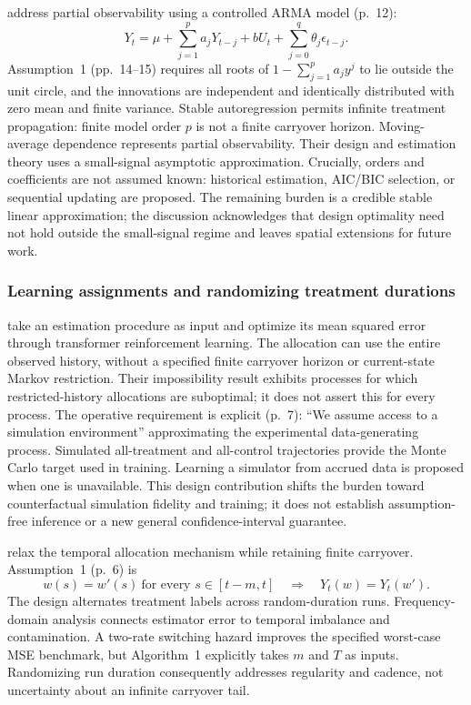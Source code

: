 \documentclass[12pt]{article}
\begin{document}
\citet{sun2024} address partial observability using a controlled ARMA model (p.~12):
\begin{equation}
 Y_t=\mu+\sum_{j=1}^{p}a_jY_{t-j}+bU_t
       +\sum_{j=0}^{q}\theta_j\epsilon_{t-j}.
\end{equation}
Assumption~1 (pp.~14--15) requires all roots of $1-\sum_{j=1}^{p}a_j y^j$ to lie outside the unit circle, and the innovations are independent and identically distributed with zero mean and finite variance. Stable autoregression permits infinite treatment propagation: finite model order $p$ is not a finite carryover horizon. Moving-average dependence represents partial observability. Their design and estimation theory uses a small-signal asymptotic approximation. Crucially, orders and coefficients are not assumed known: historical estimation, AIC/BIC selection, or sequential updating are proposed. The remaining burden is a credible stable linear approximation; the discussion acknowledges that design optimality need not hold outside the small-signal regime and leaves spatial extensions for future work.

\subsubsection{Learning assignments and randomizing treatment durations}

\citet{wu2026} take an estimation procedure as input and optimize its mean squared error through transformer reinforcement learning. The allocation can use the entire observed history, without a specified finite carryover horizon or current-state Markov restriction. Their impossibility result exhibits processes for which restricted-history allocations are suboptimal; it does not assert this for every process. The operative requirement is explicit (p.~7): ``We assume access to a simulation environment'' approximating the experimental data-generating process. Simulated all-treatment and all-control trajectories provide the Monte Carlo target used in training. Learning a simulator from accrued data is proposed when one is unavailable. This design contribution shifts the burden toward counterfactual simulation fidelity and training; it does not establish assumption-free inference or a new general confidence-interval guarantee.

\citet{hu2026} relax the temporal allocation mechanism while retaining finite carryover. Assumption~1 (p.~6) is
\begin{equation}
 w(s)=w'(s)\ \text{for every }s\in[t-m,t]
 \quad\Longrightarrow\quad Y_t(w)=Y_t(w').
\end{equation}
The design alternates treatment labels across random-duration runs. Frequency-domain analysis connects estimator error to temporal imbalance and contamination. A two-rate switching hazard improves the specified worst-case MSE benchmark, but Algorithm~1 explicitly takes $m$ and $T$ as inputs. Randomizing run duration consequently addresses regularity and cadence, not uncertainty about an infinite carryover tail.
\end{document}
